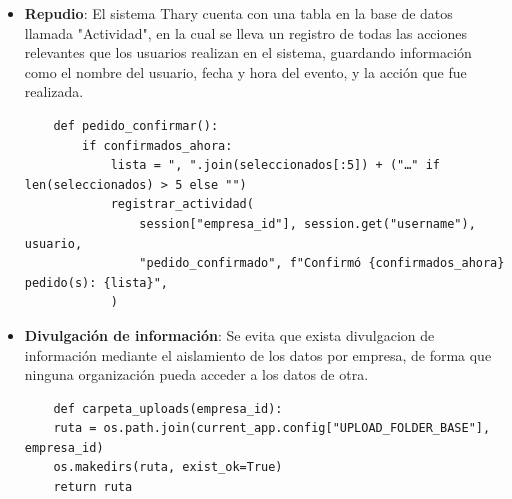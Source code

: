 \begin{itemize}
    \label{lst:pedido_confirmar_valores}
    \begin{verbatim}
    def pedido_confirmar():
    #...
    for producto_id in seleccionados:
        fila = productos_por_id.get(producto_id)
        if fila is None:
            continue
        proveedor = request.form.get(f"proveedor_{producto_id}") or "Sin especificar"
        registrar_pedido(
            empresa_id=session["empresa_id"],
            producto_id=producto_id,
            proveedor=proveedor,
            cantidad=fila.get("cantidad_sugerida_pedido"),
            costo=fila.get("costo_estimado_pedido"),
            usuario=usuario,
        )
    \end{verbatim}

    \item \textbf{Repudio}: El sistema Thary cuenta con una tabla en la base de datos llamada "Actividad", en la cual se lleva un registro de todas las acciones relevantes que los usuarios realizan en el sistema, guardando información como el nombre del usuario, fecha y hora del evento, y la acción que fue realizada.
    
    \label{lst:pedido_confirmar_actividad}
    \begin{verbatim}
    def pedido_confirmar():
        if confirmados_ahora:
            lista = ", ".join(seleccionados[:5]) + ("…" if len(seleccionados) > 5 else "")
            registrar_actividad(
                session["empresa_id"], session.get("username"), usuario,
                "pedido_confirmado", f"Confirmó {confirmados_ahora} pedido(s): {lista}",
            )
    \end{verbatim}

    \item \textbf{Divulgación de información}: Se evita que exista divulgacion de información mediante el aislamiento de los datos por empresa, de forma que ninguna organización pueda acceder a los datos de otra.
    
    \label{lst:carpeta_uploads}
    \begin{verbatim}
    def carpeta_uploads(empresa_id):
    ruta = os.path.join(current_app.config["UPLOAD_FOLDER_BASE"], empresa_id)
    os.makedirs(ruta, exist_ok=True)
    return ruta



\end{verbatim}
\end{itemize}
